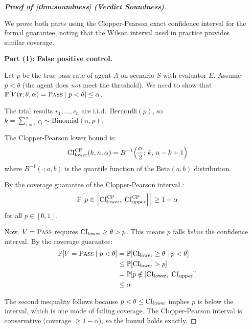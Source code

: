\begin{proof}[\textbf{Proof of \cref{thm:soundness} (Verdict Soundness)}]
\label{app:proof:soundness}

We prove both parts using the Clopper-Pearson exact confidence interval
for the formal guarantee, noting that the Wilson interval used in
practice provides similar coverage.

\textbf{Part (1): False positive control.}

Let $p$ be the true pass rate of agent $A$ on scenario $S$ with
evaluator $E$. Assume $p < \theta$ (the agent does \emph{not} meet the
threshold). We need to show that
$\mathbb{P}[V(\mathbf{r}; \theta, \alpha) = \textsc{Pass} \mid p < \theta] \leq \alpha$.

The trial results $r_1, \ldots, r_n$ are i.i.d.\
$\text{Bernoulli}(p)$, so $k = \sum_{i=1}^n r_i \sim
\text{Binomial}(n, p)$.

The Clopper-Pearson lower bound is:
\begin{equation}
  \mathrm{CI}_{\text{lower}}^{\text{CP}}(k, n, \alpha) =
    B^{-1}\!\left(\frac{\alpha}{2};\, k,\, n - k + 1\right)
\end{equation}
where $B^{-1}(\cdot; a, b)$ is the quantile function of the
$\text{Beta}(a, b)$ distribution.

By the coverage guarantee of the Clopper-Pearson interval
\citep{clopper1934use}:
\begin{equation}
  \mathbb{P}\!\left[p \in \left[\mathrm{CI}_{\text{lower}}^{\text{CP}},\;
    \mathrm{CI}_{\text{upper}}^{\text{CP}}\right]\right] \geq 1 - \alpha
\end{equation}
for all $p \in [0, 1]$.

Now, $V = \textsc{Pass}$ requires $\mathrm{CI}_{\text{lower}} \geq \theta > p$.
This means $p$ falls \emph{below} the confidence interval. By the
coverage guarantee:
\begin{align}
  \mathbb{P}[V = \textsc{Pass} \mid p < \theta]
  &= \mathbb{P}[\mathrm{CI}_{\text{lower}} \geq \theta \mid p < \theta] \\
  &\leq \mathbb{P}[\mathrm{CI}_{\text{lower}} > p] \\
  &= \mathbb{P}\!\left[p \notin
    \left[\mathrm{CI}_{\text{lower}},\; \mathrm{CI}_{\text{upper}}\right]\right] \\
  &\leq \alpha
\end{align}

The second inequality follows because $p < \theta \leq \mathrm{CI}_{\text{lower}}$
implies $p$ is below the interval, which is one mode of failing
coverage. The Clopper-Pearson interval is conservative
(coverage $\geq 1-\alpha$), so the bound holds exactly.


\end{proof}
